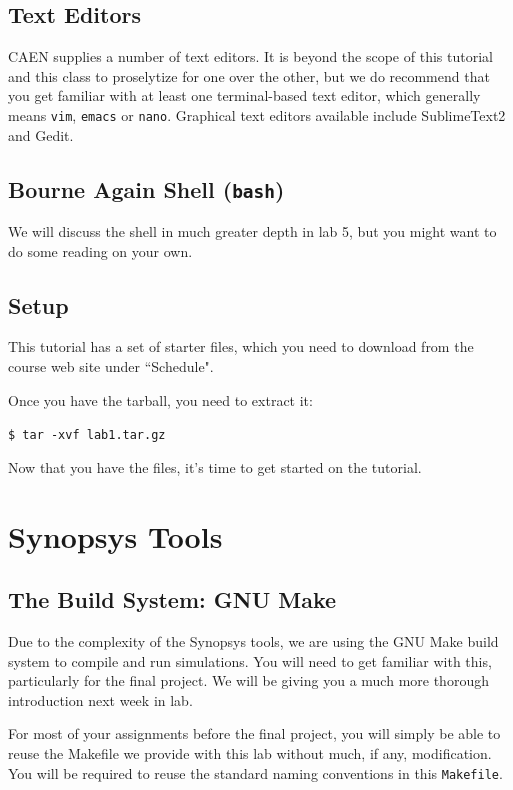 \documentclass[dvipsnames]{article}
\begin{document}
\subsection{Text Editors}
CAEN supplies a number of text editors. It is beyond the scope of this tutorial
and this class to proselytize for one over the other, but we do recommend that
you get familiar with at least one terminal-based text editor, which generally
means \texttt{vim}, \texttt{emacs} or \texttt{nano}. Graphical text editors
available include SublimeText2 and Gedit. 

\subsection{Bourne Again Shell (\texttt{bash})}
We will discuss the shell in much greater depth in lab 5, but you might want to
do some reading on your own.

\subsection{Setup}
This tutorial has a set of starter files, which you need to download from the course web site under ``Schedule".



\noindent
Once you have the tarball, you need to extract it:

\noindent
\texttt{\$ tar -xvf lab1.tar.gz}

\noindent
Now that you have the files, it's time to get started on the tutorial. 
\section{Synopsys Tools}
\subsection{The Build System: GNU Make}
Due to the complexity of the Synopsys tools, we are using the GNU Make build
system to compile and run simulations. You will need to get familiar with this,
particularly for the final project. We will be giving you a much more thorough
introduction next week in lab. 

For most of your assignments before the final project, you will simply be able
to reuse the Makefile we provide with this lab without much, if any,
modification. You will be required to reuse the standard naming conventions in
this \texttt{Makefile}.
\end{document}
